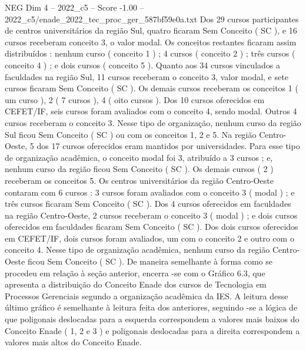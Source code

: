 \begin{textsample}{NEG Dim 4 – 2022\_c5 – Score -1.00 – 2022\_c5/enade\_2022\_tec\_proc\_ger\_587bf59e0a.txt}
Dos 29 cursos participantes de centros universitários da região Sul, quatro ficaram Sem Conceito ( SC ), e 16 cursos receberam conceito 3, o valor modal.
Os conceitos restantes ficaram assim distribuídos : nenhum curso ( conceito 1 ) ; 4 cursos ( conceito 2 ) ; três cursos ( conceito 4 ) ; e dois cursos ( conceito 5 ).
Quanto aos 34 cursos vinculados a faculdades na região Sul, 11 cursos receberam o conceito 3, valor modal, e sete cursos ficaram Sem Conceito ( SC ).
Os demais cursos receberam os conceitos 1 ( um curso ), 2 ( 7 cursos ), 4 ( oito cursos ).
Dos 10 cursos oferecidos em CEFET/IF, seis cursos foram avaliados com o conceito 4, sendo modal.
Outros 4 cursos receberam o conceito 3.
Nesse tipo de organização, nenhum curso da região Sul ficou Sem Conceito ( SC ) ou com os conceitos 1, 2 e 5.
Na região Centro-Oeste, 5 dos 17 cursos oferecidos eram mantidos por universidades.
Para esse tipo de organização acadêmica, o conceito modal foi 3, atribuído a 3 cursos ; e, nenhum curso da região ficou Sem Conceito ( SC ).
Os demais cursos ( 2 ) receberam os conceitos 5.
Os centros universitários da região Centro-Oeste contaram com 6 cursos : 3 cursos foram avaliados com o conceito 3 ( modal ) ; e três cursos ficaram Sem Conceito ( SC ).
Dos 4 cursos oferecidos em faculdades na região Centro-Oeste, 2 cursos receberam o conceito 3 ( modal ) ; e dois cursos oferecidos em faculdades ficaram Sem Conceito ( SC ).
Dos dois cursos oferecidos em CEFET/IF, dois cursos foram avaliados, um com o conceito 2 e outro com o conceito 4.
Nesse tipo de organização acadêmica, nenhum curso da região Centro-Oeste ficou Sem Conceito ( SC ).
De maneira semelhante à forma como se procedeu em relação à seção anterior, encerra -se com o Gráfico 6.3, que apresenta a distribuição do Conceito Enade dos cursos de Tecnologia em Processos Gerenciais segundo a organização acadêmica da IES.
A leitura desse último gráfico é semelhante à leitura feita dos anteriores, seguindo -se a lógica de que poligonais deslocadas para a esquerda correspondem a valores mais baixos do Conceito Enade ( 1, 2 e 3 ) e poligonais deslocadas para a direita correspondem a valores mais altos do Conceito Enade.

\end{textsample}
